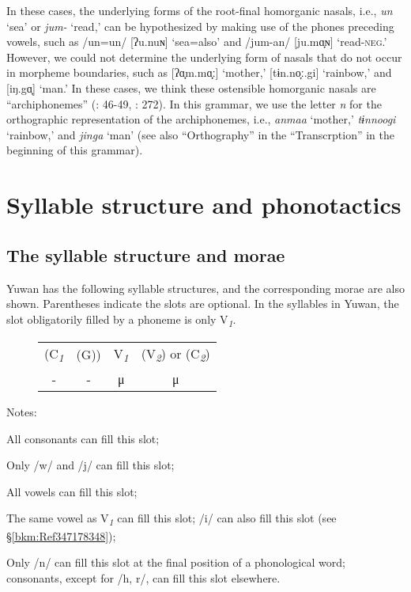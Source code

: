 In these cases, the underlying forms of the root-final homorganic nasals, i.e., \textit{un} ‘sea’ or \textit{jum-} ‘read,’ can be hypothesized by making use of the phones preceding vowels, such as /un=un/ [ʔu.nuɴ] ‘sea=also’ and /jum-an/ [ju.mɑ̟ɴ] ‘read-\textsc{neg}.’ However, we could not determine the underlying form of nasals that do not occur in morpheme boundaries, such as [ʔɑ̟m.mɑ̟ː] ‘mother,’ [tɨn.no̞ː.gi] ‘rainbow,’ and [iŋ.gɑ̟] ‘man.’ In these cases, we think these ostensible homorganic nasals are “archiphonemes” (\citealt{Lass1984}: 46-49, \citealt{Dixon2010}: 272). In this grammar, we use the letter \textit{n} for the orthographic representation of the archiphonemes, i.e., \textit{anmaa} ‘mother,’ \textit{tɨnnoogi} ‘rainbow,’ and \textit{jinga} ‘man’ (see also “Orthography” in the “Transcrption” in the beginning of this grammar).

\section{Syllable structure and phonotactics}
\label{bkm:Ref302599307}\hypertarget{RefHeadingToc395696969}{}\subsection{The syllable structure and morae}
\label{bkm:Ref301830963}\hypertarget{RefHeadingToc395696970}{}\label{bkm:Ref381399409}
Yuwan has the following syllable structures, and the corresponding morae are also shown. Parentheses indicate the slots are optional. In the syllables in Yuwan, the slot obligatorily filled by a phoneme is only V\textit{\textsubscript{1}}.

\begin{figure}
\caption{}
\begin{tabular}{cccc}
 (C\textit{\textsubscript{1}} & (G)) & V\textit{\textsubscript{1}} & (V\textit{\textsubscript{2}})  or  (C\textit{\textsubscript{2}})\\
 {}- & {}- & μ  & μ\\
\end{tabular}
\end{figure}

Notes: 
\begin{description}[font=\normalfont]
\item[C\textit{\textsubscript{1}}:] All consonants can fill this slot;
\item[G:] Only /w/ and /j/ can fill this slot;
\item[V\textit{\textsubscript{1}}:] All vowels can fill this slot;
\item[V\textit{\textsubscript{2}}:] The same vowel as V\textit{\textsubscript{1}} can fill this slot; /i/ can also fill this slot (see §\ref{bkm:Ref347178348});
\item[C\textit{\textsubscript{2}}:] Only /n/ can fill this slot at the final position of a phonological word; consonants, except for /h, r/, can fill this slot elsewhere.
\end{description}


